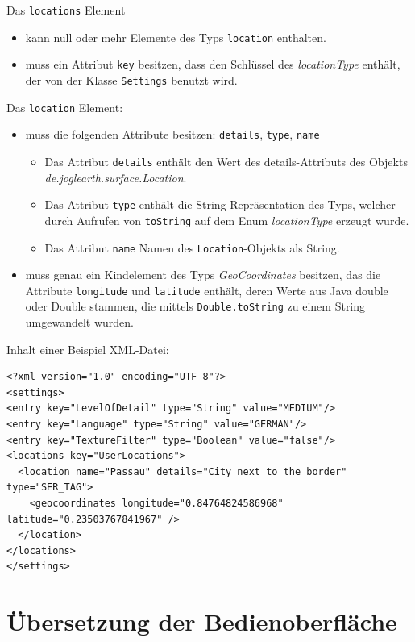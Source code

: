 \documentclass[10pt]{scrreprt}
\begin{document}
 Das \texttt{locations} Element
\begin{itemize}
 \item kann null oder mehr Elemente des Typs \texttt{location} enthalten.
 \item muss ein Attribut \texttt{key} besitzen, dass den Schlüssel des \textit{locationType} enthält, der von der Klasse \texttt{Settings} benutzt wird.
\end{itemize}

 Das \texttt{location} Element:
\begin{itemize}
 \item muss die folgenden Attribute besitzen: \texttt{details}, \texttt{type}, \texttt{name}
 \begin{itemize}
  \item Das Attribut \texttt{details} enthält den Wert des details-Attributs des Objekts \textit{de.joglearth.surface.Location}.
  \item Das Attribut \texttt{type} enthält die String Repräsentation des Typs, welcher durch Aufrufen von \texttt{toString} auf dem Enum \textit{locationType} erzeugt wurde.
  \item Das Attribut \texttt{name} Namen des \texttt{Location}-Objekts als String.
  \end{itemize}
 \item muss genau ein Kindelement des Typs \textit{GeoCoordinates} besitzen, das die Attribute \texttt{longitude} und \texttt{latitude} enthält, deren Werte aus Java double oder Double stammen, die mittels \texttt{Double.toString} zu einem String umgewandelt wurden.
\end{itemize}
\newpage
Inhalt einer Beispiel XML-Datei:
\lstset{language=XML}
\begin{lstlisting}[frame=single]
<?xml version="1.0" encoding="UTF-8"?>
<settings>
<entry key="LevelOfDetail" type="String" value="MEDIUM"/>
<entry key="Language" type="String" value="GERMAN"/>
<entry key="TextureFilter" type="Boolean" value="false"/>
<locations key="UserLocations">
  <location name="Passau" details="City next to the border" type="SER_TAG">
    <geocoordinates longitude="0.84764824586968" latitude="0.23503767841967" />
  </location>
</locations>
</settings>
\end{lstlisting}


\chapter{Übersetzung der Bedienoberfläche}
\end{document}
